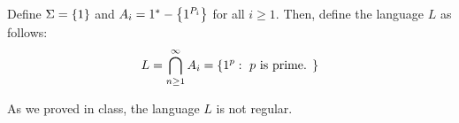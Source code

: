 \begin{problem}
\begin{enumalph}
\begin{Answer}
        \step
        Define $\Sigma = \left\{1\right\}$ and $A_i = 1^* - \left\{1^{P_i}\right\}$ for all $i \geq 1$.
        Then, define the language $L$ as follows:
        \[ L = \bigcap_{n \geq 1}^\infty A_i = \left\{1^p : \text{ $p$ is prime. }\right\} \]

        \step
        As we proved in class, the language $L$ is not regular.
      \end{Answer}
  \end{enumalph}

\end{problem}

